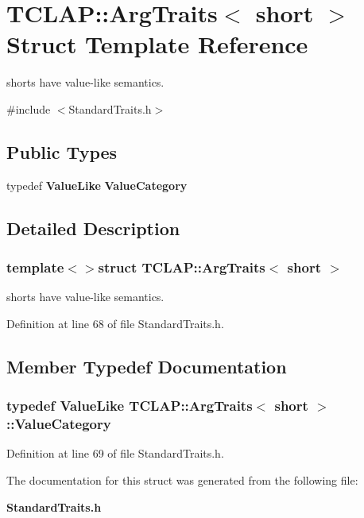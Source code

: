 \section{T\+C\+L\+A\+P\+:\+:Arg\+Traits$<$ short $>$ Struct Template Reference}
\label{structTCLAP_1_1ArgTraits_3_01short_01_4}


shorts have value-\/like semantics.  




{\ttfamily \#include $<$Standard\+Traits.\+h$>$}

\subsection*{Public Types}
\begin{DoxyCompactItemize}
\item 
typedef {\bf Value\+Like} {\bf Value\+Category}
\end{DoxyCompactItemize}


\subsection{Detailed Description}
\subsubsection*{template$<$$>$struct T\+C\+L\+A\+P\+::\+Arg\+Traits$<$ short $>$}

shorts have value-\/like semantics. 

Definition at line 68 of file Standard\+Traits.\+h.



\subsection{Member Typedef Documentation}
\subsubsection[{Value\+Category}]{\setlength{\rightskip}{0pt plus 5cm}typedef {\bf Value\+Like} {\bf T\+C\+L\+A\+P\+::\+Arg\+Traits}$<$ short $>$\+::{\bf Value\+Category}}\label{structTCLAP_1_1ArgTraits_3_01short_01_4_a99f5d76501b120d6455b528aa7bf6896}


Definition at line 69 of file Standard\+Traits.\+h.



The documentation for this struct was generated from the following file\+:\begin{DoxyCompactItemize}
\item 
{\bf Standard\+Traits.\+h}\end{DoxyCompactItemize}
